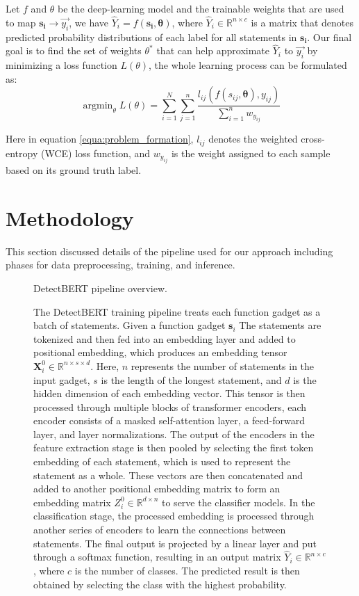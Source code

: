 \documentclass{ieeeaccess}
\DeclareMathOperator*{\argmin}{argmin}
\begin{document}
    
Let $f$ and $\theta$ be the deep-learning model and the trainable weights that are used to map $\mathbf{s_i} \rightarrow \Vec{y_i}$, we have  $\hat{Y}_i=f(\mathbf{s_i},\mathbf{\theta})$, where $\hat{Y}_i \in \mathbb{R}^{n\times c}$ is a matrix that denotes predicted probability distributions of each label for all statements in $\mathbf{s_i}$. Our final goal is to find the set of weights $\theta^*$ that can help  approximate $\hat{Y}_i$ to $\Vec{y_i}$ by minimizing a loss function $L(\theta)$, the whole learning process can be formulated as:
\begin{equation} \label{equa:problem_formation}
\argmin_\theta L(\theta)=\sum _{i=1}^{N}\sum_{j=1}^{n}\frac{l_{ij}(f(s_{ij},\mathbf{\theta}),y_{ij})}{\sum _{i=1}^{n} w_{y_{ij}}}\end{equation}
 
Here in equation \ref{equa:problem_formation}, $l_{ij}$ denotes the weighted cross-entropy (WCE) loss function, and $w_{y_{ij}}$ is the weight assigned to each sample based on its ground truth label.

\section{Methodology} \label{sec:method}
This section discussed details of the pipeline used for our approach including phases for data preprocessing, training, and inference. 
\begin{figure}[h]
    \centering
    
    \caption{DetectBERT pipeline overview.} 
    \label{fig:overview}  
\end{figure}
\begin{figure}[h]
    \centering
    
    \caption{The DetectBERT training pipeline treats each function gadget as a batch of statements. Given a function gadget $\mathbf{s}_i$ The statements are tokenized and then fed into an embedding layer and added to positional embedding, which produces an embedding tensor $\mathbf{X}_i^0 \in \mathbb{R}^{n \times s \times d}$. Here, $n$ represents the number of statements in the input gadget, $s$ is the length of the longest statement, and $d$ is the hidden dimension of each embedding vector. This tensor is then processed through multiple blocks of transformer encoders, each encoder consists of a masked self-attention layer, a feed-forward layer, and layer normalizations.  The output of the encoders in the feature extraction stage is then pooled by selecting the first token embedding of each statement, which is used to represent the statement as a whole. These vectors are then concatenated and added to another positional embedding matrix to form an embedding matrix $Z^0_i \in \mathbb{R}^{d \times n}$ to serve the classifier models. In the classification stage, the processed embedding is processed through another series of encoders to learn the connections between statements. The final output is projected by a linear layer and put through a softmax function, resulting in an output matrix $\hat{Y}_i \in \mathbb{R}^{n \times c}$, where $c$ is the number of classes. The predicted result is then obtained by selecting the class with the highest probability.
   } \label{fig:train}
\end{figure}
\end{document}
